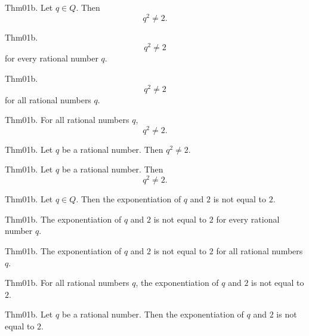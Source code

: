 \documentclass{article}
\begin{document}
Thm01b. Let $q \in Q$. Then $$q ^ {2}\neq 2.$$

Thm01b. $$q ^ {2}\neq 2$$ for every rational number $q$.

Thm01b. $$q ^ {2}\neq 2$$ for all rational numbers $q$.

Thm01b. For all rational numbers $q$, $$q ^ {2}\neq 2.$$

Thm01b. Let $q$ be a rational number. Then $q ^ {2}\neq 2$.

Thm01b. Let $q$ be a rational number. Then $$q ^ {2}\neq 2.$$

Thm01b. Let $q \in Q$. Then the exponentiation of $q$ and $2$ is not equal to $2$.

Thm01b. The exponentiation of $q$ and $2$ is not equal to $2$ for every rational number $q$.

Thm01b. The exponentiation of $q$ and $2$ is not equal to $2$ for all rational numbers $q$.

Thm01b. For all rational numbers $q$, the exponentiation of $q$ and $2$ is not equal to $2$.

Thm01b. Let $q$ be a rational number. Then the exponentiation of $q$ and $2$ is not equal to $2$.
\end{document}
